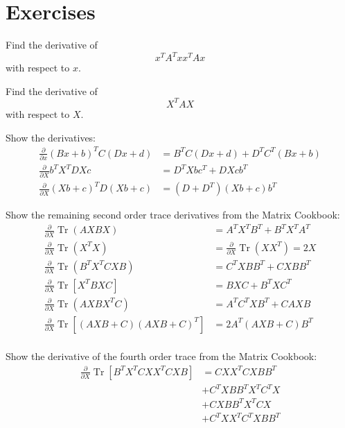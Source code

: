 \section{Exercises}
\begin{exercise}
   Find the derivative of \[x^T A^T x x^T A x\] with respect to $x$.
\end{exercise}

\begin{exercise}
   Find the derivative of \[X^T A X\] with respect to $X$.
\end{exercise}

\begin{exercise}
   Show the derivatives:
   \begin{align*}
   \tag{78}
   \frac{\partial}{\partial x} (Bx+b)^T C (Dx+d)
   &= B^TC(Dx+d) + D^TC^T(Bx+b)
   \\
   \tag{82}
   \frac{\partial}{\partial X} b^T X^T D X c
   &= D^T X b c^T + DXcb^T
   \\
   \tag{83}
   \frac{\partial}{\partial X} (Xb+c)^T D (Xb+c)
   &= (D+D^T)(Xb+c)b^T
   \end{align*}
\end{exercise}

\begin{exercise}
   Show the remaining second order trace derivatives from the Matrix Cookbook:
   \begin{align*}
      \tag{114}
   \frac{\partial}{\partial X} \operatorname{Tr}(A X B X)
   &=A^T X^T B^T+B^T X^T A^T
   \\
   \tag{115}
   \frac{\partial}{\partial X} \operatorname{Tr}\left(X^T X\right)
   &=\frac{\partial}{\partial X} \operatorname{Tr}\left(X X^T\right)=2 X
   \\
   \tag{116}
   \frac{\partial}{\partial X} \operatorname{Tr}\left(B^T X^T C X B\right)
   &=C^T X B B^T+C X B B^T
   \\
   \tag{117}
   \frac{\partial}{\partial X} \operatorname{Tr}\left[X^T B X C\right]
   &=B X C+B^T X C^T
   \\
   \tag{118}
   \frac{\partial}{\partial X} \operatorname{Tr}\left(A X B X^T C\right)
   &=A^T C^T X B^T+C A X B
   \\
   \tag{119}
   \frac{\partial}{\partial X} \operatorname{Tr}\left[(A X B+C)(A X B+C)^T\right]
   &=2 A^T(A X B+C) B^T
   \\
   \end{align*}
\end{exercise}

\begin{exercise}
   Show the derivative of the fourth order trace from the Matrix Cookbook:
   \begin{align*}
      \tag{123}
\frac{\partial}{\partial X} \operatorname{Tr}\left[B^T X^T C X X^T C X B\right]
&= C X X^T C X B B^T 
\\&+ C^T X B B^T X^T C^T X 
\\&+ C X B B^T X^T C X 
\\&+ C^T X X^T C^T X B B^T
   \end{align*}
\end{exercise}

